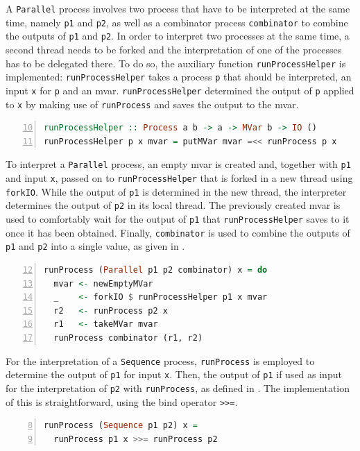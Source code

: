 A \texttt{Parallel} process involves two process that have to be interpreted at the same time, namely \texttt{p1} and \texttt{p2}, as well as a combinator process \texttt{combinator} to combine the outputs of \texttt{p1} and \texttt{p2}. In order to interpret two processes at the same time, a second thread needs to be forked and the interpretation of one of the processes has to be delegated there. To do so, the auxiliary function \texttt{runProcessHelper} is implemented: \texttt{runProcessHelper} takes a process \texttt{p} that should be interpreted, an input \texttt{x} for \texttt{p} and an mvar. \texttt{runProcessHelper} determined the output of \texttt{p} applied to \texttt{x} by making use of \texttt{runProcess} and saves the output to the mvar.
\begin{lstlisting}[language=Haskell,caption=Auxiliary function for the interpretation of \texttt{Parallel} processes.,label=lst:local_runprocesshelper,numbers=left,frame=bt,firstnumber=10]
runProcessHelper :: Process a b -> a -> MVar b -> IO ()
runProcessHelper p x mvar = putMVar mvar =<< runProcess p x
\end{lstlisting}

To interpret a \texttt{Parallel} process, an empty mvar is created and, together with \texttt{p1} and input \texttt{x}, passed on to \texttt{runProcessHelper} that is forked in a new thread using \texttt{forkIO}. While the output of \texttt{p1} is determined in the new thread, the interpreter determines the output of \texttt{p2} in its local thread. The previously created mvar is used to comfortably wait for the output of \texttt{p1} that \texttt{runProcessHelper} saves to it once it has been obtained. Finally, \texttt{combinator} is used to combine the outputs of \texttt{p1} and \texttt{p2} into a single value, as given in .
\begin{lstlisting}[language=Haskell,caption=Implementation of the interpreter for \texttt{Parallel} processes.,numbers=left,frame=bt,label=lst:local_runprocess_parallel,firstnumber=12]
runProcess (Parallel p1 p2 combinator) x = do
  mvar <- newEmptyMVar
  _    <- forkIO $ runProcessHelper p1 x mvar
  r2   <- runProcess p2 x
  r1   <- takeMVar mvar
  runProcess combinator (r1, r2)
\end{lstlisting}

For the interpretation of a \texttt{Sequence} process, \texttt{runProcess} is employed to determine the output of \texttt{p1} for input \texttt{x}. Then, the output of \texttt{p1} if used as input for the interpretation of \texttt{p2} with \texttt{runProcess}, as defined in . The implementation of this is straightforward, using the bind operator \texttt{>}\texttt{>=}.
\begin{lstlisting}[language=Haskell,caption=Implementation of the interpreter for \texttt{Sequence} processes.,label=lst:local_runprocess_sequence,numbers=left,frame=bt,firstnumber=8]
runProcess (Sequence p1 p2) x =
  runProcess p1 x >>= runProcess p2
\end{lstlisting}

